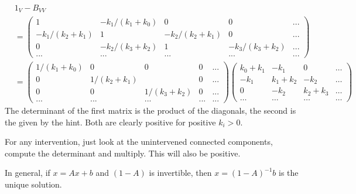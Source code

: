 \begin{gradedsolution}
	\begin{align*}
		&1_V-B_{VV}\\
		&=\begin{pmatrix}
			1 & -k_1/(k_1+k_0) & 0 & 0 & ... \\
			-k_1 / (k_2+k_1) & 1 & -k_2 / (k_2+k_1) & 0 & ... \\
			0& -k_2 / (k_3+k_2) & 1 & -k_3 / (k_3+k_2) & ... \\
			... & ... & ... & ... & ... 
		\end{pmatrix}\\
		&=\begin{pmatrix}
			1/(k_1+k_0) & 0 & 0 & 0 & ... \\
			0& 1/ (k_2+k_1) &  & 0 & ... \\
			0& 0& 1 / (k_3+k_2) &0& ... \\
			... & ... & ... & ... & ... 
		\end{pmatrix}
		\begin{pmatrix}
			k_0+k_1 & -k_1       &     0     &    \dots     \\
			-k_1     & k_1 + k_2 & -k_2       &  \dots        \\
			0		& -k_2       & k_2 + k_3 &  \dots \\
				\dots	&   \dots        & \dots   & \dots  
		  \end{pmatrix}
	\end{align*}
	The determinant of the first matrix is the product of the diagonals, the second is the given by the hint. Both are clearly positive for positive $k_i>0$.

	For any intervention, just look at the unintervened connected components, compute the determinant and multiply. This will also be positive.

	In general, if $x=Ax+b$ and $(1-A)$ is invertible, then $x=(1-A)^{-1}b$ is the unique solution.
\end{gradedsolution}

